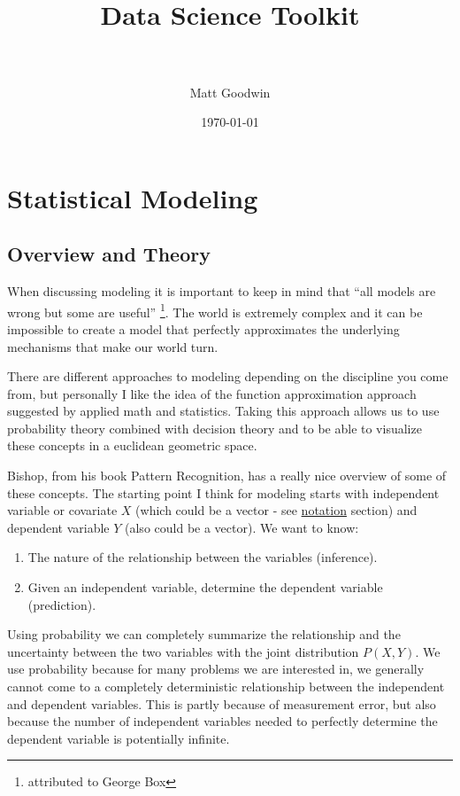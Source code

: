 \documentclass[paper=a4, fontsize=11pt]{scrartcl} %
\title{	
\normalfont \normalsize 
\horrule{0.5pt} \\[0.4cm] %
\huge Data Science Toolkit \\ %
\horrule{2pt} \\[0.5cm] %
}
\author{Matt Goodwin} %
\date{\normalsize\today} %
\numberwithin{equation}{section} %
\numberwithin{figure}{section} %
\numberwithin{table}{section} %
\begin{document}
\maketitle 

\tableofcontents
\newpage


\section{Statistical Modeling}
\subsection{Overview and Theory}

When discussing modeling it is important to keep in mind that ``all models are wrong but some are useful'' \footnote{attributed to George Box}. The world is extremely complex and it can be impossible to create a model that perfectly approximates the underlying mechanisms that make our world turn.

There are different approaches to modeling depending on the discipline you come from, but personally I like the idea of the function approximation approach suggested by applied math and statistics. Taking this approach allows us to use probability theory combined with decision theory and to be able to visualize these concepts in a euclidean geometric space.

Bishop, from his book Pattern Recognition, has a really nice overview of some of these concepts. The starting point I think for modeling starts with independent variable or covariate $X$ (which could be a vector - see \hyperref[sec:notation]{notation} section) and dependent variable $Y$ (also could be a vector). We want to know:

\begin{enumerate}
\item The nature of the relationship between the variables (inference). 
\item Given an independent variable, determine the dependent variable (prediction).
\end{enumerate}

Using probability we can completely summarize the relationship and the uncertainty between the two variables with the joint distribution $P(X,Y)$. We use probability because for many problems we are interested in, we generally cannot come to a completely deterministic relationship between the independent and dependent variables. This is partly because of measurement error, but also because the number of independent variables needed to perfectly determine the dependent variable is potentially infinite. 
\end{document}
